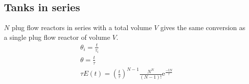 \documentclass[10pt, oneside, twocolumn]{article}
\numberwithin{equation}{section}
\begin{document}
	\subsection{Tanks in series}
	$N$ plug flow reactors in series with a total volume $V$ gives the same conversion as a single plug flow reactor of volume $V$.
		\begin{gather}
		\theta_i=\frac{t}{\tau_i}\\
		\theta=\frac{t}{\tau}\\
		\tau E(t)={\left(\frac{t}{\tau}\right)}^{N-1}\frac{N^N}{(N-1)!}\mathrm{e}^{\frac{-tN}{\tau}}		
		\end{gather}
\end{document}
